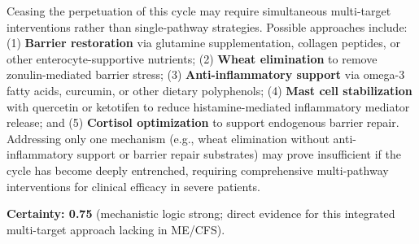 \begin{hypothesis}
\label{hyp:multi-target-intervention}
Ceasing the perpetuation of this cycle may require simultaneous multi-target interventions rather than single-pathway strategies. Possible approaches include: (1) \textbf{Barrier restoration} via glutamine supplementation, collagen peptides, or other enterocyte-supportive nutrients; (2) \textbf{Wheat elimination} to remove zonulin-mediated barrier stress; (3) \textbf{Anti-inflammatory support} via omega-3 fatty acids, curcumin, or other dietary polyphenols; (4) \textbf{Mast cell stabilization} with quercetin or ketotifen to reduce histamine-mediated inflammatory mediator release; and (5) \textbf{Cortisol optimization} to support endogenous barrier repair. Addressing only one mechanism (e.g., wheat elimination without anti-inflammatory support or barrier repair substrates) may prove insufficient if the cycle has become deeply entrenched, requiring comprehensive multi-pathway interventions for clinical efficacy in severe patients.

\textbf{Certainty: 0.75} (mechanistic logic strong; direct evidence for this integrated multi-target approach lacking in ME/CFS).
\end{hypothesis}


